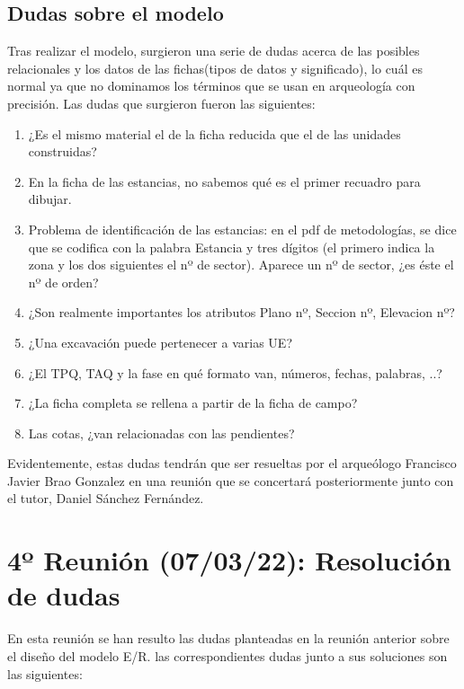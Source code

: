     \subsection{Dudas sobre el modelo} \label{subsec: doubts}
    Tras realizar el modelo, surgieron una serie de dudas acerca de las posibles relacionales
    y los datos de las fichas(tipos de datos y significado), lo cuál es normal ya que no
    dominamos los términos que se usan en arqueología con precisión. Las dudas que surgieron
    fueron las siguientes:

        \begin{enumerate}
            \item ¿Es el mismo material el de la ficha reducida que el de las unidades
            construidas?
            \item En la ficha de las estancias, no sabemos qué es el primer recuadro para
            dibujar.
            \item Problema de identificación de las estancias: en el pdf de metodologías, 
            se dice que se codifica con la palabra Estancia y tres dígitos (el primero
            indica la zona y los dos siguientes el nº de sector). Aparece un nº de sector,
            ¿es éste el nº de orden?
            \item ¿Son realmente importantes los atributos Plano nº, Seccion nº, Elevacion
            nº?
            \item ¿Una excavación puede pertenecer a varias UE?
            \item ¿El TPQ, TAQ y la fase en qué formato van, números, fechas, palabras, ..?
            \item ¿La ficha completa se rellena a partir de la ficha de campo?
            \item Las cotas, ¿van relacionadas con las pendientes?
        \end{enumerate}

    Evidentemente, estas dudas tendrán que ser resueltas por el arqueólogo Francisco Javier
    Brao Gonzalez en una reunión que se concertará posteriormente junto con el tutor,
    Daniel Sánchez Fernández.

\section{4º Reunión (07/03/22): Resolución de dudas}
En esta reunión se han resulto las dudas planteadas en la reunión anterior sobre el diseño
del modelo E/R. las correspondientes dudas junto a sus soluciones son las siguientes:

